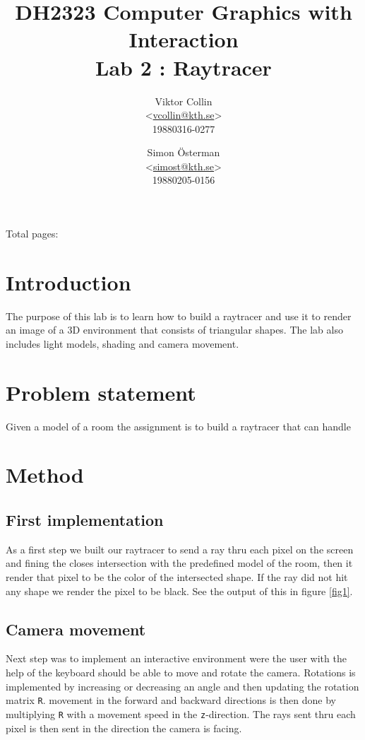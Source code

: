 \documentclass[a4paper,11pt]{article}
\author{Viktor Collin \\ <\url{vcollin@kth.se}> \\ 19880316-0277 \and Simon \"{O}sterman \\ <\url{simost@kth.se}> \\ 19880205-0156}
\title{\textbf{DH2323 Computer Graphics with Interaction \\ Lab 2 : Raytracer}}
\begin{document}
\maketitle
\begin{center}
Total pages: \pageref{LastPage}
\end{center}
\thispagestyle{empty}

\clearpage
\setcounter{page}{1}
\section{Introduction}
The purpose of this lab is to learn how to build a raytracer and use it to render an image of a 3D environment that consists of triangular shapes. The lab also includes light models, shading and camera movement. 
\section{Problem statement}
Given a model of a room the assignment is to build a raytracer that can handle 
\section{Method}
\subsection{First implementation}
As a first step we built our raytracer to send a ray thru each pixel on the screen and fining the closes intersection with the predefined model of the room, then it render that pixel to be the color of the intersected shape. If the ray did not hit any shape we  render the pixel to be black. See the output of this in figure \ref{fig1}.

\subsection{Camera movement}
Next step was to implement an interactive environment were the user with the help of the keyboard should be able to move and rotate the camera. Rotations is implemented by increasing or decreasing an angle and then updating the rotation matrix \verb|R|. movement in the forward and backward directions is then done by multiplying \verb|R| with a movement speed in the \verb|z|-direction. The rays sent thru each pixel is then sent in the direction the camera is facing.
\end{document}
